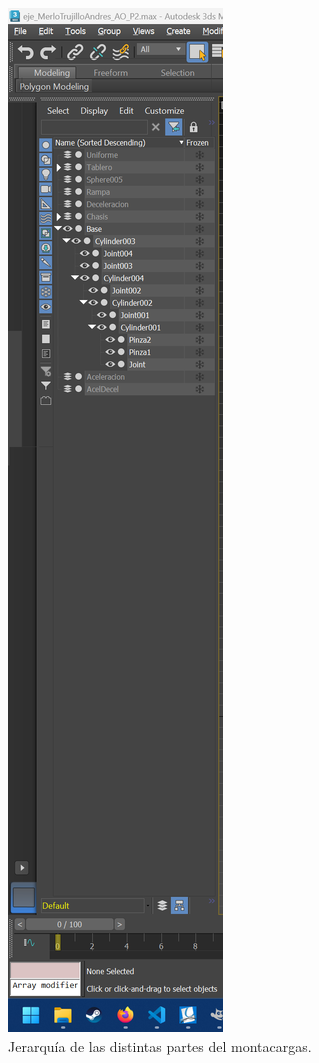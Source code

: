 \documentclass{article}
\begin{document}
\begin{figure}[H]
    \centering
    \includegraphics[width=\textwidth]{imagenes/Ejercicio4/jerarquia.png}
    \caption{Jerarquía de las distintas partes del montacargas.}
\end{figure}
\end{document}
